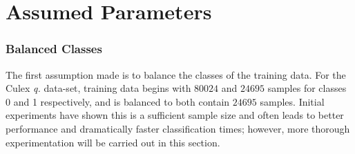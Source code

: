             
    \section{Assumed Parameters}
    \label{subsec:exp-clf-ass}
        \subsubsection{Balanced Classes}
        \label{subsubsec:exp-clf-ass-bal}
            The first assumption made is to balance the classes of the training data. For the Culex \textit{q.} data-set, training data begins with $80024$ and $24695$ samples for classes 0 and 1 respectively, and is balanced to both contain $24695$ samples. Initial experiments have shown this is a sufficient sample size and often leads to better performance and dramatically faster classification times; however, more thorough experimentation will be carried out in this section.
    
